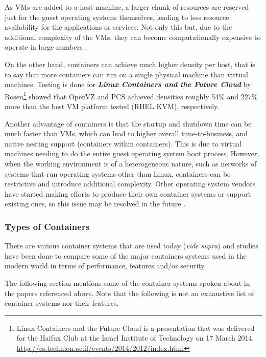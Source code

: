 As VMs are added to a host machine, a larger chunk of resources are reserved just for the guest operating systems themselves, leading to less resource availability for the applications or services. Not only this but, due to the additional complexity of the VMs, they can become computationally expensive to operate in large numbers \parencite{gupta2015comparison}.

On the other hand, containers can achieve much higher density per host, that is to say that more containers can run on a single physical machine than virtual machines. Testing is done for \textbf{\textit{Linux Containers and the Future Cloud}} by Rosen\footnote{Linux Containers and the Future Cloud is a presentation that was delivered for the Haifux Club at the Israel Institute of Technology on 17 March 2014. \url{http://cs.technion.ac.il/events/2014/2012/index.html}} \parencite{rosen2014linux} showed that OpenVZ and PCS achieved densities roughly 54\% and 227\% more than the best VM platform tested (RHEL KVM), respectively. 

Another advantage of containers is that the startup and shutdown time can be much faster than VMs, which can lead to higher overall time-to-business, and native nesting support (containers within containers). This is due to virtual machines needing to do the entire guest operating system boot process. However, when the working environment is of a heterogeneous nature, such as networks of systems that run operating systems other than Linux, containers can be restrictive and introduce additional complexity. Other operating system vendors have started making efforts to produce their own container systems or support existing ones, so this issue may be resolved in the future \parencite{ms_docker}.


\subsubsection{Types of Containers}

There are various container systems that are used today (\textit{vide supra}) and studies have been done to compare some of the major containers systems used in the modern world in terms of performance, features and/or security \parencite{bui2015analysis,gupta2015comparison,xavier2013performance}.

The following section mentions some of the container systems spoken about in the papers referenced above. Note that the following is not an exhaustive list of container systems nor their features.

